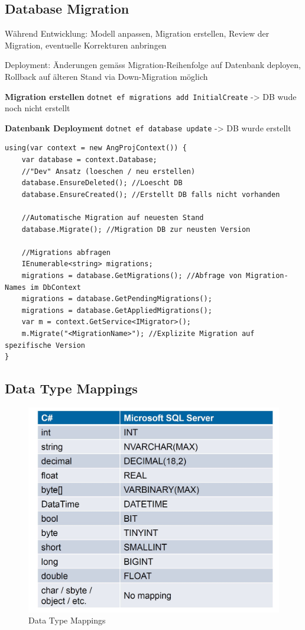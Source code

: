 \documentclass[
a4paper,
oneside,
10pt,
fleqn,
headsepline,
toc=listofnumbered, 
bibliography=totocnumbered]{scrartcl}
\begin{document}
\subsection{Database Migration}
Während Entwicklung:
Modell anpassen, Migration erstellen, Review der Migration, eventuelle Korrekturen anbringen

Deployment:
Änderungen gemäss Migration-Reihenfolge auf Datenbank deployen, Rollback auf älteren Stand via Down-Migration möglich

\textbf{Migration erstellen}
\lstinline{dotnet ef migrations add InitialCreate}
-> DB wude noch nicht erstellt

\textbf{Datenbank Deployment}
\lstinline{dotnet ef database update}
-> DB wurde erstellt

\begin{lstlisting}
using(var context = new AngProjContext()) {
    var database = context.Database;
    //"Dev" Ansatz (loeschen / neu erstellen)
    database.EnsureDeleted(); //Loescht DB
    database.EnsureCreated(); //Erstellt DB falls nicht vorhanden
    
    //Automatische Migration auf neuesten Stand
    database.Migrate(); //Migration DB zur neusten Version
    
    //Migrations abfragen
    IEnumerable<string> migrations;
    migrations = database.GetMigrations(); //Abfrage von Migration-Names im DbContext
    migrations = database.GetPendingMigrations();
    migrations = database.GetAppliedMigrations();
    var m = context.GetService<IMigrator>(); 
    m.Migrate("<MigrationName>"); //Explizite Migration auf spezifische Version
}
\end{lstlisting}

\clearpage

\subsection{Data Type Mappings}
\begin{figure}[ht]
	\centering
	\includegraphics[width=0.7\linewidth]{images/datatypemappings}
	\caption{Data Type Mappings}
	\label{fig:datatypemappings}
\end{figure}
\end{document}
